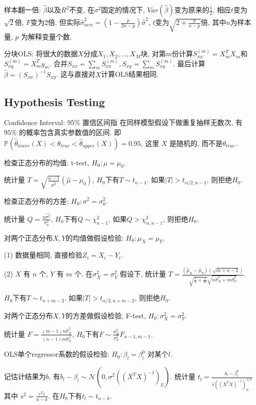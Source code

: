 \documentclass[UTF8]{ctexart}
\begin{document}
样本翻一倍: $\hat{\beta}$以及$R^2$不变, 
在$\sigma^2$固定的情况下, $Var(\hat{\beta})$变为原来的$\frac{1}{2}$, 相应$t$变为$\sqrt{2}$倍, $F$变为2倍.
但实际$\hat{\sigma}_{new}^2 = (1-\frac{p}{2n-p})\hat{\sigma}^2$, $t$变为$\sqrt{2+\frac{p}{n-p}}$倍,
其中$n$为样本量, $p$ 为解释变量个数.


分块OLS: 将很大的数据$X$分成$X_1, X_2, \dots, X_M$块,
对第$m$份计算$S_{xx}^{(m)}=X_m^TX_m$和$S_{xy}^{(m)}=X_m^Ty_m$.
合并$S_{xx}=\sum_m S_{xx}^{(m)}, S_{xy}=\sum_m S_{xy}^{(m)}$.
最后计算$\hat{\beta}=(S_{xx})^{-1}S_{xy}$. 这与直接对$X$计算OLS结果相同.

\subsection{Hypothesis Testing}

Confidence Interval: $95\%$ 置信区间指
在同样模型假设下做重复抽样无数次, 有 $95\%$ 的概率包含真实参数值的区间.
即 $\mathbb{P}(\hat{\theta}_{lower}(X) < \theta_{true} < \hat{\theta}_{upper}(X)) = 0.95$,
这里 $X$ 是随机的, 而不是$\theta_{true}$.

\noindent 检查正态分布的均值: t-test, $H_0: \mu=\mu_0$. \par
统计量 $T = \sqrt{\frac{n-1}{\hat{\sigma^2}}}(\hat{\mu}-\mu_0)$, $H_0$下有$T\sim t_{n-1}$.
如果$|T|>t_{\alpha/2,n-1}$, 则拒绝$H_0$.

\noindent 检查正态分布的方差: $H_0: \sigma^2=\sigma_0^2$.\par 
统计量 $Q = \frac{n \hat{\sigma^2}}{\sigma_0^2}$, $H_0$下有$Q\sim \chi^2_{n-1}$.
如果$Q> \chi^2_{\alpha,n-1}$, 则拒绝$H_0$.

\noindent 对两个正态分布$X, Y$的均值做假设检验: $H_0: \mu_X=\mu_Y$. \par 
(1) 数据量相同, 直接检验$Z_i=X_i-Y_i$. \par 
(2) $X$ 有 $n$ 个, $Y$ 有 $m$ 个.
在$\sigma_X^2 = \sigma_Y^2$ 假设下, 
统计量 $T = \frac{(\hat{\mu}_X-\hat{\mu}_Y)(\sqrt{m+n-2})}{\sqrt{\frac{1}{n}+\frac{1}{m}}\sqrt{n\hat{\sigma}_X^2+m\hat{\sigma}_Y^2}}$. \par 
$H_0$下有$T\sim t_{n+m-2}$.
如果$|T|>t_{\alpha/2,n+m-2}$, 则拒绝$H_0$.

\noindent 对两个正态分布$X, Y$的方差做假设检验, F-test, $H_0: \sigma_X^2=\sigma_Y^2$. \par 
统计量 $F = \frac{(m-1)n \hat{\sigma}_X^2}{(n-1)m \hat{\sigma}_Y^2}$,
$H_0$下有$F\sim \frac{\sigma_X^2}{\sigma_Y^2}F_{n-1,m-1}$.

\noindent OLS单个regressor系数的假设检验: $H_0: \beta_l=\beta_l^0$ 对某个$l$. \par
记估计结果为$b$, 有$b_l-\beta_l \sim \mathcal{N}(0,\sigma^2((X^TX)^{-1})_{ll})$.
统计量 $t_l = \frac{b_l-\beta_l^0}{\hat{s}((X^TX)^{-1})_{ll}^{1/2}}$ 其中 $s^2=\frac{e^Te}{n-k}$.
在$H_0$下有$t_l\sim t_{n-k}$.
\end{document}
